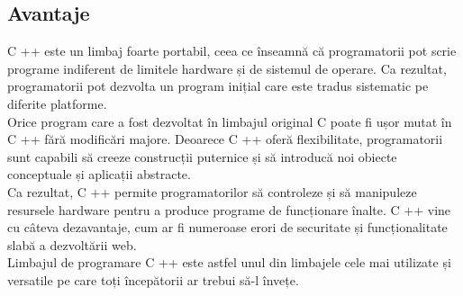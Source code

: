 \subsection{Avantaje}
C ++ este un limbaj foarte portabil, ceea ce înseamnă că programatorii pot scrie programe indiferent de limitele hardware și de sistemul de operare. Ca rezultat, programatorii pot dezvolta un program inițial care este tradus sistematic pe diferite platforme.
\vspace{6pt}
\\Orice program care a fost dezvoltat în limbajul original C poate fi ușor mutat în C ++ fără modificări majore. Deoarece C ++ oferă flexibilitate, programatorii sunt capabili să creeze construcții puternice și să introducă noi obiecte conceptuale și aplicații abstracte.
\vspace{6pt}
\\Ca rezultat, C ++ permite programatorilor să controleze și să manipuleze resursele hardware pentru a produce programe de funcționare înalte. C ++ vine cu câteva dezavantaje, cum ar fi numeroase erori de securitate și funcționalitate slabă a dezvoltării web.
\vspace{6pt}
\\Limbajul de programare C ++ este astfel unul din limbajele cele mai utilizate și versatile pe care toți începătorii ar trebui să-l învețe.

